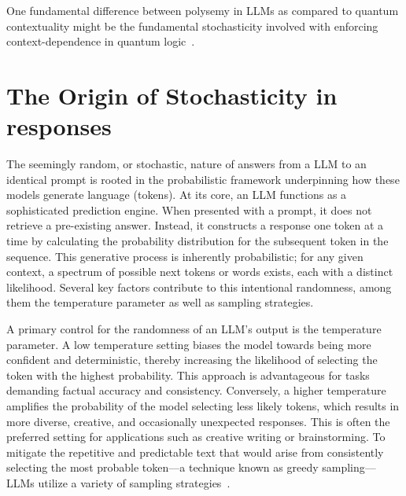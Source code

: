\documentclass[%
  reprint,
  superscriptaddress,
  showpacs,
  showkeys,
  amsmath,amssymb,
  pra,
  longbibliography,
  floatfix,
  x11names
]{revtex4-2}
\begin{document}
One fundamental difference between polysemy in LLMs as compared to quantum contextuality might be the fundamental stochasticity
involved with enforcing context-dependence in quantum logic~\cite{specker-60,kochen1}.




\section{The Origin of Stochasticity in responses}
\label{section:stochasticity}
The seemingly random, or stochastic, nature of answers from a LLM to an identical prompt
is rooted in the probabilistic framework underpinning how these models generate language (tokens).
At its core, an LLM functions as a sophisticated prediction engine.
When presented with a prompt, it does not retrieve a pre-existing answer.
Instead, it constructs a response one token at a time by calculating
the probability distribution for the subsequent token in the sequence.
This generative process is inherently probabilistic;
for any given context, a spectrum of possible next tokens or words exists,
each with a distinct likelihood.
Several key factors contribute to this intentional randomness,
among them the temperature parameter  as well as sampling strategies.

A primary control for the randomness of an LLM's output is the {temperature} parameter.
A low temperature setting biases the model towards being more confident and deterministic,
thereby increasing the likelihood of selecting the token with the highest probability.
This approach is advantageous for tasks demanding factual accuracy and consistency.
Conversely, a higher temperature amplifies the probability of the model selecting less likely tokens,
which results in more diverse, creative, and occasionally unexpected responses.
This is often the preferred setting for applications such as creative writing or brainstorming.
To mitigate the repetitive and predictable text that would arise from consistently selecting
the most probable token---a technique known as greedy sampling---LLMs utilize a
variety of sampling strategies~\cite{Jadhav2025}.
\end{document}
